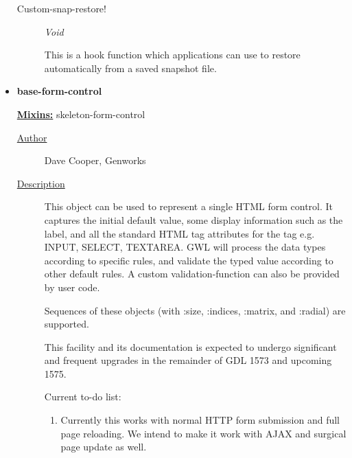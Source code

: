 \documentclass [11pt]{book}
\begin{document}
\begin{itemize}
\begin{description}

\item [Custom-snap-restore!]
\emph{Void}

 This is a hook function which applications can use to restore automatically
from a saved snapshot file.




\end{description}







\item {}
\label{prim:base-form-control}
\textbf{base-form-control}


\textbf{
\underline{Mixins:}} skeleton-form-control





\begin{description}

\item [
\underline{Author}]


Dave Cooper, Genworks



\item [
\underline{Description}]


This object can be used to represent a single HTML form control. It captures the 
initial default value, some display information such as the label, and all the standard HTML tag attributes
for the tag e.g. INPUT, SELECT, TEXTAREA. GWL will process the data types according to specific rules,
and validate the typed value according to other default rules. A custom validation-function can also 
be provided by user code. 

Sequences of these objects (with :size, :indices, :matrix, and :radial) are supported.

This facility and its documentation is expected to undergo significant and frequent upgrades in the remainder of GDL 1573 and upcoming 1575.

Current to-do list:



\begin{enumerate}

\item 
Currently this works with normal HTTP form submission and full page reloading. 
We intend to make it work with AJAX and surgical page update as well.




\end{enumerate}
\end{description}
\end{itemize}
\end{document}
